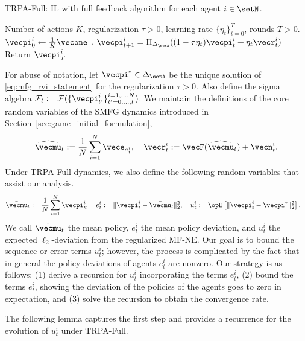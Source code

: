 \begin{algorithm}
    \caption{TRPA-Full: IL with full feedback algorithm for each agent $i \in \setN$.}\label{alg:full}
    \begin{algorithmic}
    \Require Number of actions $K$, regularization $\tau > 0$, learning rate $\{\eta_t\}_{t=0}^T$, rounds $T > 0$.
    \State $\vecpi^i_0 \leftarrow \frac{1}{K} \vecone$
    \State {}.
    \State {}
    \State $\vecpi^i_{t+1} = \Pi_{\Delta_\setA} ( (1 - \tau \eta_t) \vecpi^i_t + \eta_t \vecr^i_t )$
    \EndFor
    \State Return $\vecpi^i_T$
    \end{algorithmic}
\end{algorithm}

For abuse of notation, let $\vecpi^* \in \Delta_\setA$ be the unique solution of \eqref{eq:mfg_rvi_statement} for the regularization $\tau > 0$.
Also define the sigma algebra $\mathcal{F}_{t} := \mathcal{F}(\{ \vecpi_{t'}^i \}_{t'=0, \ldots, t}^{i=1, \ldots, N})$.
We maintain the definitions of the core random variables of the SMFG dynamics introduced in Section~\ref{sec:game_initial_formulation},
\begin{align*}
    \widehat{\vecmu}_t := \frac{1}{N} \sum_{i=1}^N \vece_{a_t^i}, \quad \vecr^i_t := \vecF(\widehat{\vecmu}_t) + \vecn_t^i.
\end{align*}
Under TRPA-Full dynamics, we also define the following random variables that assist our analysis.
\begin{align*}
    \bar{\vecmu}_t &:= \frac{1}{N} \sum_{i=1}^N \vecpi_t^i, \quad e_t^i := \|\vecpi^i_t - \bar{\vecmu}_t \|_2^2, \quad
    u_t^i := \Exop\left[\| \vecpi_t^i - \vecpi^* \|_2^2\right].
\end{align*}
We call $\bar{\vecmu}_t$ the mean policy, $e_t^i$ the mean policy deviation, and $u_t^i$ the expected $\ell_2$-deviation from the regularized MF-NE.
Our goal is to bound the sequence or error terms $u_t^i$; however, the process is complicated by the fact that in general the policy deviations of agents $e_t^i$ are nonzero.
Our strategy is as follows: 
(1) derive a  recursion for $u_t^i$ incorporating the terms $e_t^i$, 
(2) bound the terms $e_t^i$, showing the deviation of the policies of the agents goes to zero in expectation, and
(3) solve the recursion to obtain the convergence rate.

The following lemma captures the first step and provides a recurrence for the evolution of $u_t^i$ under TRPA-Full.

